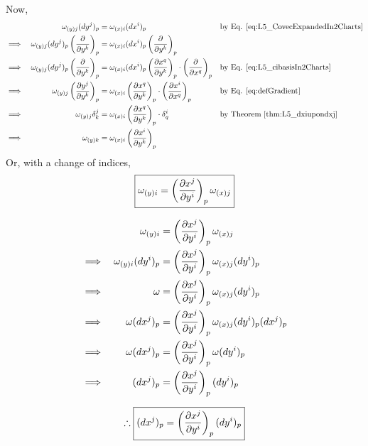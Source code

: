 Now,
\begin{align*}
  && \displaystyle\omega_{(y)j}(dy^j)_p & = \omega_{(x)i}(dx^i)_p && \text{by Eq. \ref{eq:L5_CovecExpandedIn2Charts}} \\
  \implies && \displaystyle\omega_{(y)j}(dy^j)_p \left(\cibasis{y^k}\right)_p & = \omega_{(x)i}(dx^i)_p \left(\cibasis{y^k}\right)_p \\
  \implies && \displaystyle\omega_{(y)j}(dy^j)_p \left(\cibasis{y^k}\right)_p & = \omega_{(x)i}(dx^i)_p \left(\cibasis[x^q]{y^k}\right)_p \cdot \left(\cibasis{x^q}\right)_p && \text{by Eq. \ref{eq:L5_cibasisIn2Charts}} \\
  \implies && \displaystyle\omega_{(y)j} \left(\cibasis[y^j]{y^k}\right)_p & = \omega_{(x)i} \left(\cibasis[x^q]{y^k}\right)_p \cdot \left(\cibasis[x^i]{x^q}\right)_p && \text{by Eq. \ref{eq:defGradient}} \\
  \implies && \displaystyle\omega_{(y)j} \delta^j_k & = \omega_{(x)i} \left(\cibasis[x^q]{y^k}\right)_p \cdot \delta^i_q && \text{by Theorem \ref{thm:L5_dxiupondxj}} \\
  \implies && \displaystyle\omega_{(y)k} & = \omega_{(x)i} \left(\cibasis[x^i]{y^k}\right)_p
\end{align*}
Or, with a change of indices,
\begin{equation}
\boxed{\omega_{(y)i} = \left(\cibasis[x^j]{y^i}\right)_p \omega_{(x)j}}
\end{equation}

\begin{align*}
&& \omega_{(y)i} & = \left(\cibasis[x^j]{y^i}\right)_p \omega_{(x)j} \\
\implies && \omega_{(y)i}(dy^i)_p & = \left(\cibasis[x^j]{y^i}\right)_p \omega_{(x)j}(dy^i)_p \\
\implies && \omega & = \left(\cibasis[x^j]{y^i}\right)_p \omega_{(x)j}(dy^i)_p \\
\implies && \omega (dx^j)_p & = \left(\cibasis[x^j]{y^i}\right)_p \omega_{(x)j}(dy^i)_p (dx^j)_p \\
\implies && \omega (dx^j)_p & = \left(\cibasis[x^j]{y^i}\right)_p \omega (dy^i)_p \\
\implies && (dx^j)_p & = \left(\cibasis[x^j]{y^i}\right)_p (dy^i)_p
\end{align*}

\begin{equation}\label{eq:L5_cicobasisIn2Charts}
\therefore \boxed{(dx^j)_p = \left(\cibasis[x^j]{y^i}\right)_p (dy^i)_p}
\end{equation}
